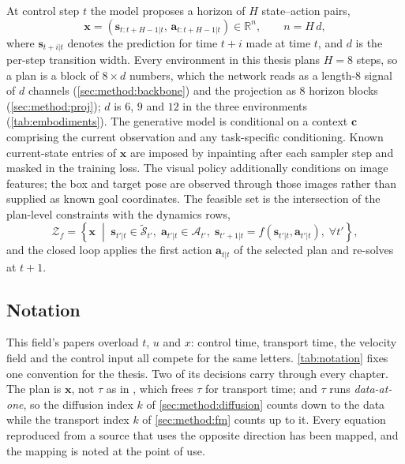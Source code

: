 \documentclass[headsepline,footsepline,footinclude=false,oneside,fontsize=11pt,paper=a4,listof=totoc,bibliography=totoc]{scrbook}
\theoremstyle{definition}
\theoremstyle{plain}
\theoremstyle{remark}
\newcommand{\vect}[1]{\boldsymbol{#1}}
\newcommand{\R}{\mathbb{R}}                    %
\newcommand{\ftime}{\tau}                      %
\begin{document}
At control step $t$ the model proposes a horizon of $H$ state--action pairs,
\begin{equation}\label{eq:method:plan}
  \vect{x}
  = \left(\vect{s}_{t:t+H-1|t},\,\vect{a}_{t:t+H-1|t}\right) \in \R^{n},
  \qquad n = H\,d,
\end{equation}
where $\vect{s}_{t+i|t}$ denotes the prediction for time $t+i$ made at time $t$, and $d$ is the
per-step transition width. Every environment in this thesis plans $H = 8$ steps, so a plan is a
block of $8 \times d$ numbers, which the network reads as a length-$8$ signal of $d$ channels
(\autoref{sec:method:backbone}) and the projection as $8$ horizon blocks
(\autoref{sec:method:proj}); $d$ is $6$, $9$ and $12$ in the three environments
(\autoref{tab:embodiments}). The generative model is conditional on a context
$\vect{c}$ comprising the current observation and any task-specific conditioning. Known current-state entries of
$\vect{x}$ are imposed by inpainting after each sampler step and masked in the training loss.
The visual policy additionally conditions on image features; the box and target pose are observed
through those images rather than supplied as known goal coordinates.
The feasible set is the intersection of the plan-level constraints with the dynamics rows,
\begin{equation}\label{eq:method:feasible}
  \mathcal{Z}_{f} = \left\{\vect{x} \;\middle|\;
    \vect{s}_{t'|t}\in\tilde{\mathcal{S}}_{t'},\;
    \vect{a}_{t'|t}\in\mathcal{A}_{t'},\;
    \vect{s}_{t'+1|t} = f(\vect{s}_{t'|t},\vect{a}_{t'|t}),\;
    \forall t'\right\},
\end{equation}
and the closed loop applies the first action $\vect{a}_{t|t}$ of the selected plan and re-solves
at $t+1$.

\subsection{Notation}

This field's papers overload $t$, $u$ and $x$: control time, transport time, the velocity field
and the control input all compete for the same letters. \autoref{tab:notation} fixes one
convention for the thesis. Two of its decisions carry through every chapter. The plan is
$\vect{x}$, not $\tau$ as in \parencite{romer2025diffusion}, which frees $\ftime$ for transport time;
and $\ftime$ runs \emph{data-at-one}, so the diffusion index $k$ of \autoref{sec:method:diffusion}
counts down to the data while the transport index $k$ of \autoref{sec:method:fm} counts up to it. Every
equation reproduced from a source that uses the opposite direction has been mapped, and the
mapping is noted at the point of use.
\end{document}
